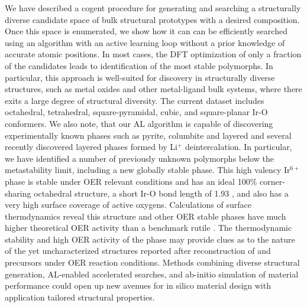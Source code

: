 


%
We have described a cogent procedure for generating and searching a  structurally diverse candidate space of bulk structural prototypes with a desired composition.
%
Once this space is enumerated, we show how it can can be efficiently searched using an algorithm with an active learning loop without a prior knowledge of accurate atomic positions.
%
In most cases, the DFT optimization of only a fraction of the candidates leads to identification of the most stable polymorphs.
%
In particular, this approach is well-suited for discovery in structurally diverse structures, such as metal oxides and other metal-ligand bulk systems, where there exits a large degree of structural diversity.
%
The current dataset includes octahedral, tetrahedral,  square-pyramidal,  cubic,  and  square-planar Ir-O conformers.
%
We also note, that our AL algorithm is capable of discovering  experimentally known phases such as pyrite, columbite and layered  \IrOtwo and several recently discovered layered \IrOthree phases formed by Li$^+$ deintercalation.
%
In particular, we have identified a number of previously unknown \IrOthree polymorphs below the metastability limit, including a new globally stable \aIrOthree phase.
%
This high valency Ir$^{6+}$ phase is stable under OER relevant conditions and has an ideal 100\% corner-sharing octahedral structure, a short Ir-O bond length of 1.93 \angstrom, and also has a very high surface coverage of active oxygens.
%
Calculations of surface thermdynamics reveal this structure and other OER stable \IrOthree phases have much higher theoretical OER activity than a benchmark rutile \IrOtwo.
%
The thermodynamic stability and high OER activity of the \aIrOthree phase may provide clues as to the nature of the yet uncharacterized structures reported after reconstruction of  and \IrOx precursors under OER reaction conditions.
%
Methods combining diverse structural generation, AL-enabled accelerated searches, and \mbox{ab-initio} simulation of material performance could open up new avenues for in silico material design with application tailored structural properties.







